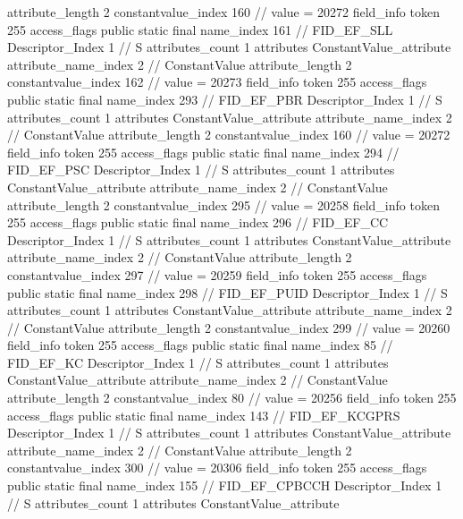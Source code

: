 {{{{{{{					attribute_length	2
					constantvalue_index	160		// value = 20272
				}
				}
			}
			field_info {
				token	255
				access_flags	public static final
				name_index	161		// FID_EF_SLL
				Descriptor_Index	1		// S
				attributes_count	1
				attributes {
				ConstantValue_attribute {
					attribute_name_index	2		// ConstantValue
					attribute_length	2
					constantvalue_index	162		// value = 20273
				}
				}
			}
			field_info {
				token	255
				access_flags	public static final
				name_index	293		// FID_EF_PBR
				Descriptor_Index	1		// S
				attributes_count	1
				attributes {
				ConstantValue_attribute {
					attribute_name_index	2		// ConstantValue
					attribute_length	2
					constantvalue_index	160		// value = 20272
				}
				}
			}
			field_info {
				token	255
				access_flags	public static final
				name_index	294		// FID_EF_PSC
				Descriptor_Index	1		// S
				attributes_count	1
				attributes {
				ConstantValue_attribute {
					attribute_name_index	2		// ConstantValue
					attribute_length	2
					constantvalue_index	295		// value = 20258
				}
				}
			}
			field_info {
				token	255
				access_flags	public static final
				name_index	296		// FID_EF_CC
				Descriptor_Index	1		// S
				attributes_count	1
				attributes {
				ConstantValue_attribute {
					attribute_name_index	2		// ConstantValue
					attribute_length	2
					constantvalue_index	297		// value = 20259
				}
				}
			}
			field_info {
				token	255
				access_flags	public static final
				name_index	298		// FID_EF_PUID
				Descriptor_Index	1		// S
				attributes_count	1
				attributes {
				ConstantValue_attribute {
					attribute_name_index	2		// ConstantValue
					attribute_length	2
					constantvalue_index	299		// value = 20260
				}
				}
			}
			field_info {
				token	255
				access_flags	public static final
				name_index	85		// FID_EF_KC
				Descriptor_Index	1		// S
				attributes_count	1
				attributes {
				ConstantValue_attribute {
					attribute_name_index	2		// ConstantValue
					attribute_length	2
					constantvalue_index	80		// value = 20256
				}
				}
			}
			field_info {
				token	255
				access_flags	public static final
				name_index	143		// FID_EF_KCGPRS
				Descriptor_Index	1		// S
				attributes_count	1
				attributes {
				ConstantValue_attribute {
					attribute_name_index	2		// ConstantValue
					attribute_length	2
					constantvalue_index	300		// value = 20306
				}
				}
			}
			field_info {
				token	255
				access_flags	public static final
				name_index	155		// FID_EF_CPBCCH
				Descriptor_Index	1		// S
				attributes_count	1
				attributes {
				ConstantValue_attribute {
}}}}}}}
